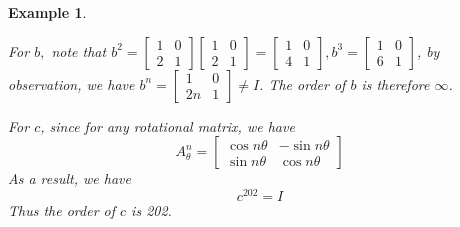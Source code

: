 \documentclass{article}
\theoremstyle{MyNonumberplain}
\theoremstyle{break}
\theoremstyle{break}
\newtheorem{example}{Example}[section]
\theoremstyle{break}
\theoremstyle{definition}
\theoremstyle{break}
\begin{document}
\begin{expbox}
\begin{example}
\begin{ansbox}
                For $b,$ note that $b^2 = \left[\begin{array}{cc}
                1 & 0\\
                2 & 1
                \end{array}\right] \left[\begin{array}{cc}
                1 & 0\\
                2 & 1
                \end{array}\right] = \left[\begin{array}{cc}
                1 & 0\\
                4 & 1
                \end{array}\right], b^3 = \left[\begin{array}{cc}
                1 & 0\\
                6 & 1
                \end{array}\right]$, by observation, we have $b^n =
                \left[\begin{array}{cc}
                1 & 0\\
                2 n & 1
                \end{array}\right] \neq I$.
                The order of $b$ is therefore $\infty$.\bigskip
        
                For $c$, since for any rotational matrix, we
                have
                \[ A^n_{\theta} = \left[\begin{array}{cc}
                    \cos n \theta & - \sin n \theta\\
                    \sin n \theta & \cos n \theta
                \end{array}\right] \]
                As a result, we have
                \[ c^{202} = I \]
                Thus the order of $c$ is 202.
        
        \end{ansbox}

    \end{example}
\end{expbox}
\end{document}
